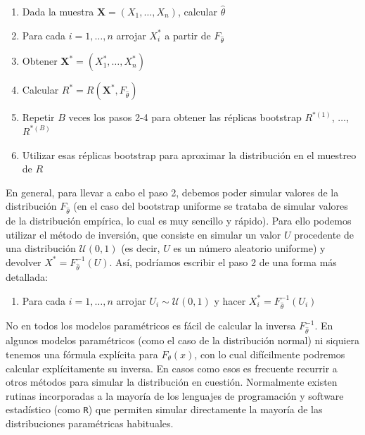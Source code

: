 \documentclass[
]{book}
\providecommand{\tightlist}{%
  \setlength{\itemsep}{0pt}\setlength{\parskip}{0pt}}
\renewcommand{\mathbf}[1]{\symbf{#1}}
\theoremstyle{break}
\theoremstyle{nonumberplain}
\begin{document}
\begin{enumerate}
\def\labelenumi{\arabic{enumi}.}
\item
  Dada la muestra
  \(\mathbf{X}=\left( X_1,\ldots ,X_n \right)\), calcular
  \(\hat{\theta}\)
\item
  Para cada \(i=1,\ldots ,n\) arrojar \(X_i^{\ast}\) a partir de
  \(F_{\hat{\theta}}\)
\item
  Obtener \(\mathbf{X}^{\ast}=\left( X_1^{\ast},\ldots
  ,X_n^{\ast} \right)\)
\item
  Calcular
  \(R^{\ast}=R\left( \mathbf{X}^{\ast},F_{\hat{\theta}
  } \right)\)
\item
  Repetir \(B\) veces los pasos 2-4 para obtener las réplicas bootstrap
  \(R^{\ast (1)}\), \(\ldots\), \(R^{\ast (B)}\)
\item
  Utilizar esas réplicas bootstrap para aproximar la distribución en el
  muestreo de \(R\)
\end{enumerate}

En general, para llevar a cabo el paso 2, debemos poder simular valores
de la distribución \(F_{\hat{\theta}}\) (en el caso del bootstrap uniforme
se trataba de simular valores de la distribución empírica, lo cual es
muy sencillo y rápido). Para ello podemos utilizar el método de
inversión, que consiste en simular un valor \(U\) procedente de una
distribución \(\mathcal{U}\left( 0,1 \right)\) (es decir, \(U\) es un número aleatorio
uniforme) y devolver \(X^{\ast}=F_{\hat{\theta}}^{-1}\left(
U \right)\). Así, podríamos escribir el paso 2 de una forma más
detallada:

\begin{enumerate}
\def\labelenumi{\arabic{enumi}.}
\setcounter{enumi}{1}
\tightlist
\item
  Para cada \(i=1,\ldots ,n\) arrojar \(U_i\sim \mathcal{U}\left( 0,1 \right)\) y
  hacer \(X_i^{\ast}=F_{\hat{\theta}}^{-1}\left( U_i \right)\)
\end{enumerate}

No en todos los modelos paramétricos es fácil de calcular la inversa
\(F_{\hat{\theta}}^{-1}\). En algunos modelos paramétricos (como el caso
de la distribución normal) ni siquiera tenemos una fórmula explícita
para \(F_{\theta }\left( x \right)\), con lo cual difícilmente podremos
calcular explícitamente su inversa. En casos como esos es frecuente
recurrir a otros métodos para simular la distribución en cuestión.
Normalmente existen rutinas incorporadas a la mayoría de los lenguajes
de programación y software estadístico (como \texttt{R}) que permiten simular
directamente la mayoría de las distribuciones paramétricas habituales.
\end{document}
